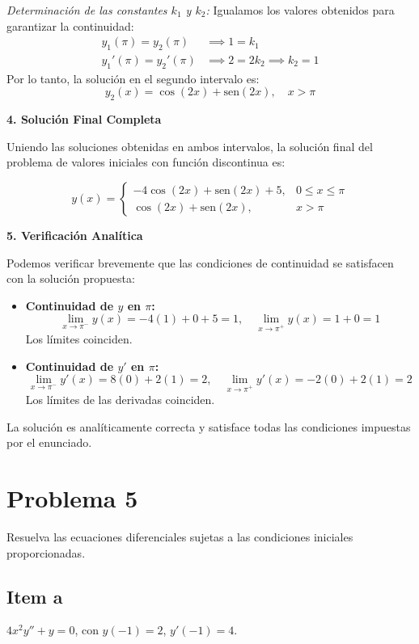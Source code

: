 \documentclass[a4paper]{article}
\begin{document}
\textit{Determinación de las constantes $k_1$ y $k_2$:}
Igualamos los valores obtenidos para garantizar la continuidad:
\begin{align*}
y_1(\pi) = y_2(\pi) & \implies 1 = k_1 \\
y_1'(\pi) = y_2'(\pi) & \implies 2 = 2k_2 \implies k_2 = 1
\end{align*}
Por lo tanto, la solución en el segundo intervalo es:
$$
y_2(x) = \cos(2x) + \text{sen}(2x), \quad x > \pi
$$

\textbf{4. Solución Final Completa}

Uniendo las soluciones obtenidas en ambos intervalos, la solución final del problema de valores iniciales con función discontinua es:

$$
y(x) = \begin{cases} 
\displaystyle -4 \cos(2x) + \text{sen}(2x) + 5, & 0 \leq x \leq \pi \\[10pt]
\displaystyle \cos(2x) + \text{sen}(2x), & x > \pi 
\end{cases}
$$

\textbf{5. Verificación Analítica}

Podemos verificar brevemente que las condiciones de continuidad se satisfacen con la solución propuesta:
\begin{itemize}
    \item \textbf{Continuidad de $y$ en $\pi$:}
    $$ \lim_{x \to \pi^-} y(x) = -4(1) + 0 + 5 = 1, \quad \lim_{x \to \pi^+} y(x) = 1 + 0 = 1 $$
    Los límites coinciden.
    \item \textbf{Continuidad de $y'$ en $\pi$:}
    $$ \lim_{x \to \pi^-} y'(x) = 8(0) + 2(1) = 2, \quad \lim_{x \to \pi^+} y'(x) = -2(0) + 2(1) = 2 $$
    Los límites de las derivadas coinciden.
\end{itemize}
La solución es analíticamente correcta y satisface todas las condiciones impuestas por el enunciado.



\section{Problema 5}
Resuelva las ecuaciones diferenciales sujetas a las condiciones iniciales proporcionadas.

\subsection{Item a}
$4x^2 y'' + y = 0$, con $y(-1) = 2$, $y'(-1) = 4$.
\end{document}
